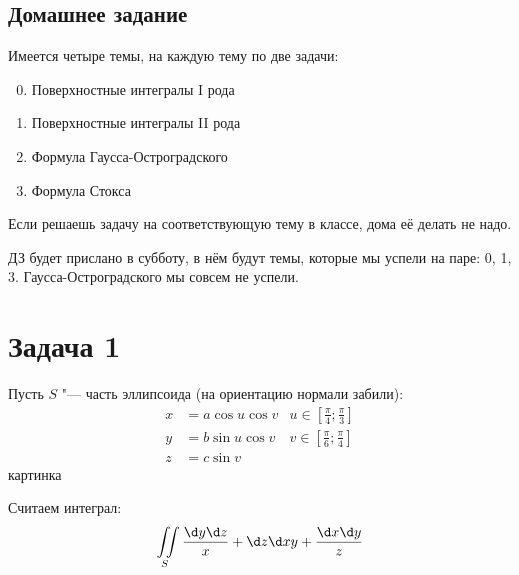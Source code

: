 \subsection{Домашнее задание}
Имеется четыре темы, на каждую тему по две задачи:
\begin{enumerate}
	\setcounter{enumi}{-1}
	\item Поверхностные интегралы I рода
	\item Поверхностные интегралы II рода
	\item Формула Гаусса-Остроградского
	\item Формула Стокса
\end{enumerate}
Если решаешь задачу на соответствующую тему в классе, дома её делать не надо.

ДЗ будет прислано в субботу, в нём будут темы, которые мы успели на паре: 0, 1, 3.
Гаусса-Остроградского мы совсем не успели.

\section{Задача 1}\label{day160218_task1}
	Пусть $S$ "--- часть эллипсоида (на ориентацию нормали забили):
	\begin{align*}
		x &= a \cos u \cos v & u \in \left[\frac \pi 4; \frac \pi 3 \right]\\
		y &= b \sin u \cos v & v \in \left[\frac \pi 6; \frac \pi 4 \right]\\
		z &= c \sin v
	\end{align*}
	\TODO картинка

	Считаем интеграл:
	\[ \iint\limits_S \frac{\d y \d z}{x} + {\d z \d x}{y} + \frac{\d x \d y}{z} \]

